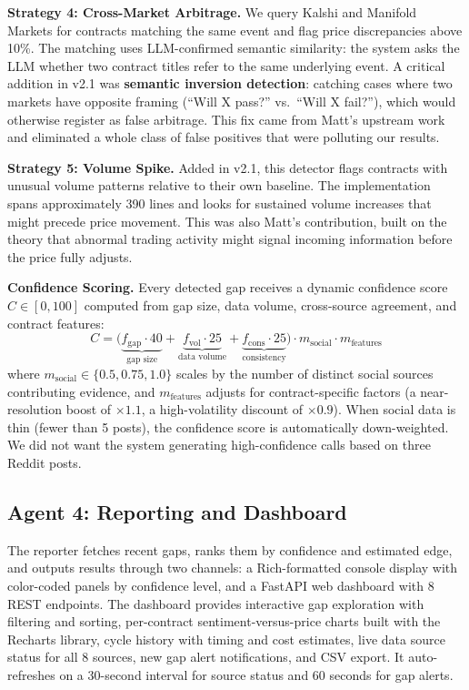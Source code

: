 \documentclass[conference]{IEEEtran}
\begin{document}
\textbf{Strategy 4: Cross-Market Arbitrage.}
We query Kalshi and Manifold Markets for contracts matching the same event and flag price discrepancies above 10\%. The matching uses LLM-confirmed semantic similarity: the system asks the LLM whether two contract titles refer to the same underlying event. A critical addition in v2.1 was \textbf{semantic inversion detection}: catching cases where two markets have opposite framing (``Will X pass?'' vs.\ ``Will X fail?''), which would otherwise register as false arbitrage. This fix came from Matt's upstream work and eliminated a whole class of false positives that were polluting our results.

\textbf{Strategy 5: Volume Spike.}
Added in v2.1, this detector flags contracts with unusual volume patterns relative to their own baseline. The implementation spans approximately 390 lines and looks for sustained volume increases that might precede price movement. This was also Matt's contribution, built on the theory that abnormal trading activity might signal incoming information before the price fully adjusts.

\textbf{Confidence Scoring.}
Every detected gap receives a dynamic confidence score $C \in [0,100]$ computed from gap size, data volume, cross-source agreement, and contract features:
\begin{equation}
C = \big( \underbrace{f_{\text{gap}} \cdot 40}_{\text{gap size}} + \underbrace{f_{\text{vol}} \cdot 25}_{\text{data volume}} + \underbrace{f_{\text{cons}} \cdot 25}_{\text{consistency}} \big) \cdot m_{\text{social}} \cdot m_{\text{features}}
\end{equation}
where $m_{\text{social}} \in \{0.5, 0.75, 1.0\}$ scales by the number of distinct social sources contributing evidence, and $m_{\text{features}}$ adjusts for contract-specific factors (a near-resolution boost of $\times 1.1$, a high-volatility discount of $\times 0.9$). When social data is thin (fewer than 5 posts), the confidence score is automatically down-weighted. We did not want the system generating high-confidence calls based on three Reddit posts.

\subsection{Agent 4: Reporting and Dashboard}

The reporter fetches recent gaps, ranks them by confidence and estimated edge, and outputs results through two channels: a Rich-formatted console display with color-coded panels by confidence level, and a FastAPI web dashboard with 8 REST endpoints. The dashboard provides interactive gap exploration with filtering and sorting, per-contract sentiment-versus-price charts built with the Recharts library, cycle history with timing and cost estimates, live data source status for all 8 sources, new gap alert notifications, and CSV export. It auto-refreshes on a 30-second interval for source status and 60 seconds for gap alerts.
\end{document}
